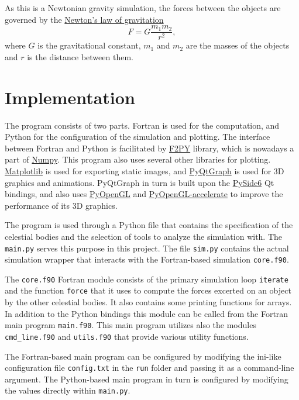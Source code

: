 \documentclass[a4paper]{article}
\begin{document}
As this is a Newtonian gravity simulation, the forces between the objects are governed by the
\href{https://en.wikipedia.org/wiki/Newton\%27s_law_of_universal_gravitation}{Newton's law of gravitation}
\begin{equation}
F = G \frac{m_1 m_2}{r^2},
\end{equation}
where $G$ is the gravitational constant, $m_1$ and $m_2$ are the masses of the objects and $r$ is the distance between them.


\clearpage
\section{Implementation}
The program consists of two parts.
Fortran is used for the computation, and Python for the configuration of the simulation and plotting.
The interface between Fortran and Python is facilitated by
\href{https://numpy.org/doc/stable/f2py/}{F2PY} library, which is nowadays a part of
\href{https://numpy.org/}{Numpy}.
This program also uses several other libraries for plotting.
\href{https://matplotlib.org/}{Matplotlib} is used for exporting static images, and 
\href{https://www.pyqtgraph.org/}{PyQtGraph} is used for 3D graphics and animations.
PyQtGraph in turn is built upon the
\href{https://pypi.org/project/PySide6/}{PySide6} Qt bindings,
and also uses
\href{https://pypi.org/project/PyOpenGL/}{PyOpenGL} and
\href{https://pypi.org/project/PyOpenGL-accelerate/}{PyOpenGL-accelerate} to improve the performance of its 3D graphics.

The program is used through a Python file that contains the specification of the celestial bodies and the selection of tools to analyze the simulation with.
The \texttt{main.py} serves this purpose in this project.
The file \texttt{sim.py} contains the actual simulation wrapper that interacts with the Fortran-based simulation \texttt{core.f90}.

The \texttt{core.f90} Fortran module consists of the primary simulation loop \texttt{iterate} and the function \texttt{force} that it uses to compute the forces excerted on an object by the other celestial bodies.
It also contains some printing functions for arrays.
In addition to the Python bindings this module can be called from the Fortran main program \texttt{main.f90}.
This main program utilizes also the modules \texttt{cmd\_line.f90} and \texttt{utils.f90} that provide various utility functions.

The Fortran-based main program can be configured by modifying the ini-like configuration file \texttt{config.txt} in the \texttt{run} folder and passing it as a command-line argument.
The Python-based main program in turn is configured by modifying the values directly within \texttt{main.py}.
\end{document}
